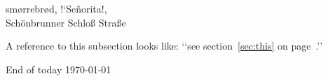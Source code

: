 \documentclass{article}
\begin{document}
sm\o rrebr\o d, !‘Se\~norita!,\\
Sch\"onbrunner Schlo\ss{}
Stra\ss e


A reference to this subsection
\label{sec:this} looks like:
‘‘see section~\ref{sec:this} on
page~\pageref{sec:this}.’’


End of today \today
\end{document}
